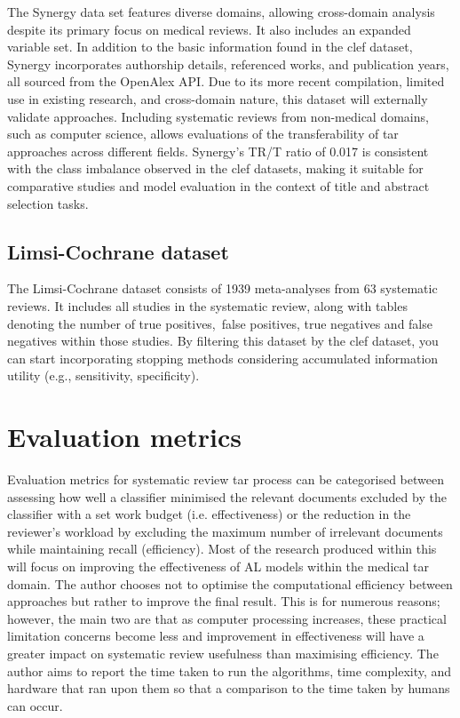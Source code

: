 \documentclass[10pt,oneside]{book}
\begin{document}
The Synergy data set features diverse domains, allowing cross-domain analysis despite its primary focus on medical reviews. It also includes an expanded variable set. In addition to the basic information found in the \gls*{clef} dataset, Synergy incorporates authorship details, referenced works, and publication years, all sourced from the OpenAlex API.
Due to its more recent compilation, limited use in existing research, and cross-domain nature, this dataset will externally validate approaches. Including systematic reviews from non-medical domains, such as computer science, allows evaluations of the transferability of \gls*{tar} approaches across different fields. Synergy's TR/T ratio of 0.017 is consistent with the class imbalance observed in the \gls*{clef} datasets, making it suitable for comparative studies and model evaluation in the context of title and abstract selection tasks.

\subsection{Limsi-Cochrane dataset}
The Limsi-Cochrane dataset consists of 1939 meta-analyses from 63 systematic reviews\cite{norman_cochrane_2018}. It includes all studies in the systematic review, along with tables denoting the number of true positives, false positives, true negatives and false negatives within those studies. By filtering this dataset by the \gls*{clef} dataset, you can start incorporating stopping methods considering accumulated information utility (e.g., sensitivity, specificity). 



\section{Evaluation metrics}
Evaluation metrics for systematic review \gls*{tar} process can be categorised between assessing how well a classifier minimised the relevant documents excluded by the classifier with a set work budget (i.e. effectiveness) or the reduction in the reviewer's workload by excluding the maximum number of irrelevant documents while maintaining recall (efficiency).  Most of the research produced within this will focus on improving the effectiveness of AL models within the medical \gls*{tar} domain. The author chooses not to optimise the computational efficiency between approaches but rather to improve the final result. This is for numerous reasons; however, the main two are that as computer processing increases, these practical limitation concerns become less and improvement in effectiveness will have a greater impact on systematic review usefulness than maximising efficiency.  The author aims to report the time taken to run the algorithms, time complexity, and hardware that ran upon them so that a comparison to the time taken by humans can occur.
\end{document}
